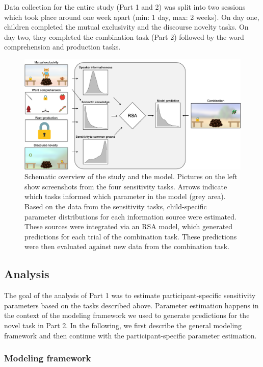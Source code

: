 \documentclass[
  man,mask,floatsintext]{apa6}
\begin{document}
Data collection for the entire study (Part 1 and 2) was split into two sessions which took place around one week apart (min: 1 day, max: 2 weeks). On day one, children completed the mutual exclusivity and the discourse novelty tasks. On day two, they completed the combination task (Part 2) followed by the word comprehension and production tasks.

\begin{figure}
\includegraphics[width=1\linewidth]{./figures/fig1} \caption{Schematic overview of the study and the model. Pictures on the left show screenshots from the four sensitivity tasks. Arrows indicate which tasks informed which parameter in the model (grey area). Based on the data from the sensitivity tasks, child-specific parameter distributions for each information source were estimated. These sources were integrated via an RSA model, which generated predictions for each trial of the combination task. These predictions were then evaluated against new data from the combination task.}\label{fig:fig1}
\end{figure}

\hypertarget{analysis}{%
\subsection{Analysis}\label{analysis}}

The goal of the analysis of Part 1 was to estimate participant-specific sensitivity parameters based on the tasks described above. Parameter estimation happens in the context of the modeling framework we used to generate predictions for the novel task in Part 2. In the following, we first describe the general modeling framework and then continue with the participant-specific parameter estimation.

\hypertarget{modeling-framework}{%
\subsubsection{Modeling framework}\label{modeling-framework}}
\end{document}
